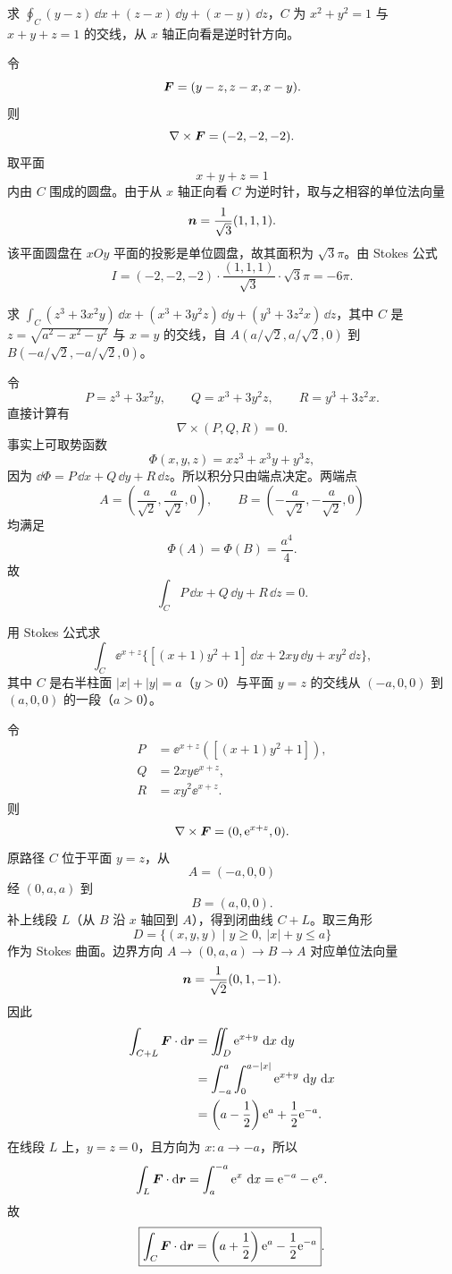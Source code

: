 \begin{xexercise}[2]
求 $\oint_C(y-z)\,\dd x+(z-x)\,\dd y+(x-y)\,\dd z$，$C$ 为 $x^2+y^2=1$ 与 $x+y+z=1$ 的交线，从 $x$ 轴正向看是逆时针方向。
\end{xexercise}
\begin{xsolution}
令
\[
  \bm{F}=(y-z,z-x,x-y).
\]
则
\[
  \nabla\times\bm{F}=(-2,-2,-2).
\]
取平面
\[
  x+y+z=1
\]
内由 $C$ 围成的圆盘。由于从 $x$ 轴正向看 $C$ 为逆时针，取与之相容的单位法向量
\[
  \bm{n}=\frac1{\sqrt3}(1,1,1).
\]
该平面圆盘在 $xOy$ 平面的投影是单位圆盘，故其面积为 $\sqrt3\pi$。由 Stokes 公式
\[
  I=(-2,-2,-2)\cdot\frac{(1,1,1)}{\sqrt3}\cdot\sqrt3\pi
  =-6\pi.
\]
\end{xsolution}


\begin{xexercise}[3]
求 $\int_C(z^3+3x^2y)\,\dd x+(x^3+3y^2z)\,\dd y+(y^3+3z^2x)\,\dd z$，其中 $C$ 是 $z=\sqrt{a^2-x^2-y^2}$ 与 $x=y$ 的交线，自 $A(a/\sqrt2,a/\sqrt2,0)$ 到 $B(-a/\sqrt2,-a/\sqrt2,0)$。
\end{xexercise}
\begin{xsolution}
令
\[
P=z^3+3x^2y,\qquad Q=x^3+3y^2z,\qquad R=y^3+3z^2x.
\]
直接计算有
\[
  \nabla\times(P,Q,R)=0.
\]
事实上可取势函数
\[
  \Phi(x,y,z)=xz^3+x^3y+y^3z,
\]
因为 $\dd\Phi=P\,\dd x+Q\,\dd y+R\,\dd z$。所以积分只由端点决定。两端点
\[
A=\left(\frac a{\sqrt2},\frac a{\sqrt2},0\right),
\qquad
B=\left(-\frac a{\sqrt2},-\frac a{\sqrt2},0\right)
\]
均满足
\[
  \Phi(A)=\Phi(B)=\frac{a^4}{4}.
\]
故
\[
  \boxed{\int_C P\,\dd x+Q\,\dd y+R\,\dd z=0}.
\]
\end{xsolution}


\begin{xexercise}[4]
用 Stokes 公式求
\[
  \int_C\ee^{x+z}\{[(x+1)y^2+1]\,\dd x+2xy\,\dd y+xy^2\,\dd z\},
\]
其中 $C$ 是右半柱面 $|x|+|y|=a$（$y>0$）与平面 $y=z$ 的交线从 $(-a,0,0)$ 到 $(a,0,0)$ 的一段（$a>0$）。
\end{xexercise}
\begin{xsolution}
令
\[
\begin{aligned}
P&=\ee^{x+z}([(x+1)y^2+1]),\\
Q&=2xy\ee^{x+z},\\
R&=xy^2\ee^{x+z}.
\end{aligned}
\]
则
\[
  \nabla\times\bm{F}=(0,\mathrm{e}^{x+z},0).
\]
原路径 $C$ 位于平面 $y=z$，从
\[
  A=(-a,0,0)
\]
经 $(0,a,a)$ 到
\[
  B=(a,0,0).
\]
补上线段 $L$（从 $B$ 沿 $x$ 轴回到 $A$），得到闭曲线 $C+L$。取三角形
\[
  D=\{(x,y,y)\mid y\ge0,\ |x|+y\le a\}
\]
作为 Stokes 曲面。边界方向 $A\to(0,a,a)\to B\to A$ 对应单位法向量
\[
  \bm{n}=\frac1{\sqrt2}(0,1,-1).
\]
因此
\begin{align*}
\int_{C+L}\bm{F}\cdot\mathop{}\!\mathrm{d}\bm{r}
&=\iint_D\mathrm{e}^{x+y}\,\mathop{}\!\mathrm{d} x\,\mathop{}\!\mathrm{d} y\\
&=\int_{-a}^{a}\int_0^{a-|x|}\mathrm{e}^{x+y}\,\mathop{}\!\mathrm{d} y\,\mathop{}\!\mathrm{d} x\\
&=\left(a-\frac12\right)\mathrm{e}^a+\frac12\mathrm{e}^{-a}.
\end{align*}
在线段 $L$ 上，$y=z=0$，且方向为 $x:a\to-a$，所以
\[
  \int_L\bm{F}\cdot\mathop{}\!\mathrm{d}\bm{r}
  =\int_a^{-a}\mathrm{e}^x\,\mathop{}\!\mathrm{d} x=\mathrm{e}^{-a}-\mathrm{e}^a.
\]
故
\[
  \boxed{
  \int_C\bm{F}\cdot\mathop{}\!\mathrm{d}\bm{r}
  =\left(a+\frac12\right)\mathrm{e}^a-\frac12\mathrm{e}^{-a}}.
\]
\end{xsolution}



